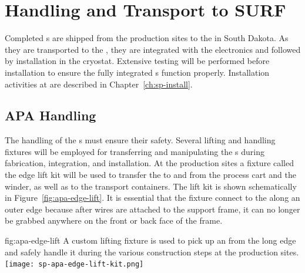 \section{Handling and Transport to SURF} %
\label{sec:fdsp-apa-transport}

Completed s are shipped from the  production sites to 
the  in South Dakota. As they are transported to the , they are integrated %
with the   electronics and  followed by installation in the cryostat. %
Extensive  testing will be performed before installation to ensure the fully integrated s function properly.  %
Installation activities at  are described in Chapter~\ref{ch:sp-install}. 

\subsection{APA Handling}
\label{sec:fdsp-apa-transport-handling}

The handling of the s  must %
ensure their safety.  Several lifting and handling fixtures will be employed for transferring and manipulating the s during fabrication, integration, and installation.  At the production sites a fixture called the edge lift kit will be used to transfer the  to and from the process cart and the winder, as well as to the transport containers.  The lift kit is shown schematically in Figure~\ref{fig:apa-edge-lift}.  It is essential that the fixture connect to the  along an outer edge because after wires are attached to the support frame, it can no longer be grabbed anywhere on the front or back face of the frame. 

\begin{dunefigure}{fig:apa-edge-lift}
{A custom lifting fixture is used to pick up an  from the long edge and safely handle it during the various construction steps at the production sites.}  
\texttt{[image: sp-apa-edge-lift-kit.png]} 
\end{dunefigure}

